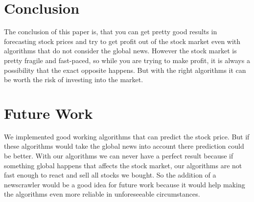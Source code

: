 \documentclass[conference]{IEEEtran}
\begin{document}



\section{Conclusion}
\label{conclusion}

The conclusion of this paper is, that you can get pretty good results in forecasting stock prices and try to get profit out of the stock market even with algorithms that do not consider the global news. However the stock market is pretty fragile and fast-paced, so while you are trying to make profit, it is always a possibility that the exact opposite happens. But with the right algorithms it can be worth the risk of investing into the market. 

\section{Future Work}
\label{futurework}

We implemented good working algorithms that can predict the stock price. But if these algorithms would take the global news into account there prediction could be better. With our algorithms we can never have a perfect result because if something global happens that affects the stock market, our algorithms are not fast enough to react and sell all stocks we bought. So the addition of a newscrawler would be a good idea for future work because it would help making the algorithms even more reliable in unforeseeable circumstances.



\end{document}
